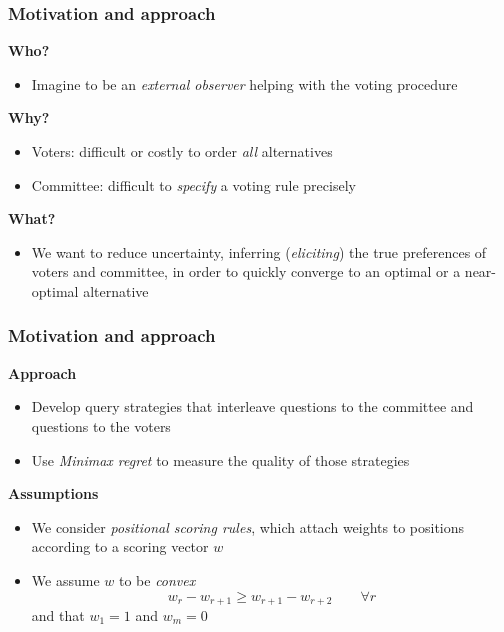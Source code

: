 \documentclass{beamer}
\begin{document}
\begin{frame}
	\frametitle{Motivation and approach}
	\textbf{Who?}
	\begin{itemize}
		\item Imagine to be an \emph{external observer} helping with the voting procedure
	\end{itemize}
	 \textbf{Why?}
	\begin{itemize}
		\item Voters: difficult or costly to order \emph{all} alternatives
		\item Committee: difficult to \emph{specify} a voting rule precisely
	\end{itemize}
	 \textbf{What?}
	\begin{itemize}
		\item We want to reduce uncertainty, inferring (\textit{eliciting}) the true preferences of voters and committee, in order to quickly converge to an optimal
		or a near-optimal alternative
	\end{itemize}		
\end{frame}

\begin{frame}
	\frametitle{Motivation and approach}
	 \textbf{Approach}
	\begin{itemize}
		\item Develop query strategies that interleave questions to the committee and questions to the voters
		\item Use \emph{Minimax regret} to measure the quality of those strategies
	\end{itemize}
	 \textbf{Assumptions}
	\begin{itemize}
		\item We consider \textit{positional scoring rules}, which attach weights to positions according to a scoring vector $w$
		\item We assume $w$ to be \textit{convex}
		\[ w_r - w_{r+1} \geq w_{r+1}-w_{r+2} \qquad \forall r\]
		and that $w_1=1$ and $w_m=0$
	\end{itemize}	
\end{frame}
\end{document}

